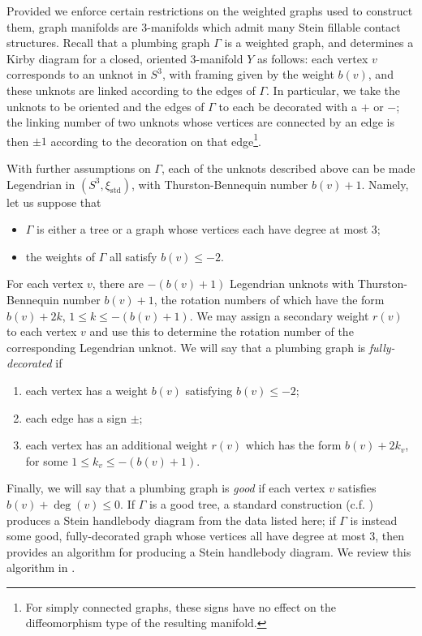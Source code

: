 \documentclass[11pt]{amsart}
\numberwithin{equation}{section}
\theoremstyle{plain}
\theoremstyle{definition}
\theoremstyle{remark}\newtheorem{rem}[equation]{Remark}%
\theoremstyle{remark}\newtheorem{obs}[equation]{Observation}%
\begin{document}
Provided we enforce certain restrictions on the weighted graphs used to construct them, graph manifolds are 3-manifolds which admit many Stein fillable contact structures.  Recall that a plumbing graph $\Gamma$ is a weighted graph, and determines a Kirby diagram for a closed, oriented 3-manifold $Y$ as follows: each vertex $v$ corresponds to an unknot in $S^3$, with framing given by the weight $b(v)$, and these unknots are linked according to the edges of $\Gamma$.  In particular, we take the unknots to be oriented and the edges of $\Gamma$ to each be decorated with a $+$ or $-$; the linking number of two unknots whose vertices are connected by an edge is then $\pm 1$ according to the decoration on that edge\footnote{For simply connected graphs, these signs have no effect on the diffeomorphism type of the resulting manifold.}.

With further assumptions on $\Gamma$, each of the unknots described above can be made Legendrian in $(S^3,\xi_{\mathrm{std}})$, with Thurston-Bennequin number $b(v)+1$.  Namely, let us suppose that
\begin{itemize}
    \item $\Gamma$ is either a tree or a graph whose vertices each have degree at most 3;
    \item the weights of $\Gamma$ all satisfy $b(v)\leq -2$.
\end{itemize}
For each vertex $v$, there are $-(b(v)+1)$ Legendrian unknots with Thurston-Bennequin number $b(v)+1$, the rotation numbers of which have the form $b(v)+2k$, $1\leq k\leq -(b(v)+1)$.  We may assign a secondary weight $r(v)$ to each vertex $v$ and use this to determine the rotation number of the corresponding Legendrian unknot.  We will say that a plumbing graph is \emph{fully-decorated} if
\begin{enumerate}
    \item each vertex has a weight $b(v)$ satisfying $b(v)\leq -2$;
    \item each edge has a sign $\pm$;
    \item each vertex has an additional weight $r(v)$ which has the form $b(v)+2k_v$, for some $1\leq k_v\leq -(b(v)+1)$.
\end{enumerate}
Finally, we will say that a plumbing graph is \emph{good} if each vertex $v$ satisfies $b(v)+\deg(v)\leq 0$.  If $\Gamma$ is a good tree, a standard construction (c.f. \cite[Section 4.6]{gompf20234}) produces a Stein handlebody diagram from the data listed here; if $\Gamma$ is instead some good, fully-decorated graph whose vertices all have degree at most 3, then \cite[Section 5]{shah2024tight} provides an algorithm for producing a Stein handlebody diagram.  We review this algorithm in .
\end{document}
